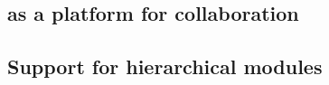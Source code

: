 
\subsection{\easybuild{} as a platform for collaboration}

\subsection{Support for hierarchical modules}
